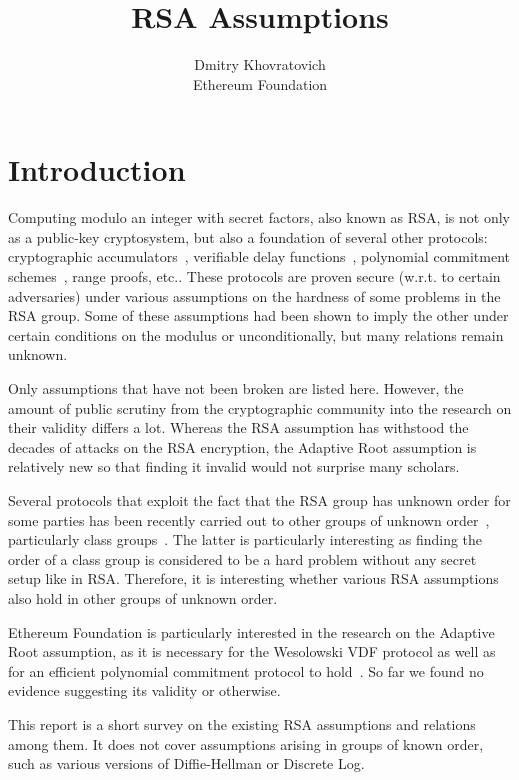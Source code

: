 \documentclass[a4paper]{article}
\title{RSA Assumptions}
\author{Dmitry Khovratovich\\Ethereum Foundation}
\begin{document}
\maketitle

\section{Introduction}

Computing modulo an integer with secret factors, also known as RSA, is not only as a public-key cryptosystem, but also  a foundation of several other protocols: cryptographic accumulators~\cite{DBLP:conf/crypto/CamenischL02}, verifiable delay functions~\cite{DBLP:conf/eurocrypt/Wesolowski19,DBLP:conf/crypto/BonehBBF18}, polynomial commitment schemes~\cite{cryptoeprint:2019:1229}, range proofs, etc.. These protocols are proven secure (w.r.t. to certain adversaries) under various assumptions on the hardness of some problems in the RSA group.  Some of these assumptions had been shown to imply the other under certain conditions on the modulus or unconditionally, but many relations remain unknown. 

Only assumptions that have not been broken are listed here. However, the amount of public scrutiny from the cryptographic community into the research on their validity differs a lot. Whereas the RSA assumption has withstood the decades of attacks on the RSA encryption, the Adaptive Root assumption is relatively new so that finding it invalid would not surprise many scholars.

Several protocols that exploit the fact that the RSA group has unknown order for some parties has been recently carried out to other groups of unknown order~\cite{DBLP:conf/crypto/BonehBBF18,cryptoeprint:2019:1229}, particularly class groups~\cite{buchmann2001survey}. The latter is particularly interesting as finding the order of a class group is considered to be a hard problem without any secret setup like in RSA. Therefore, it is interesting whether various RSA assumptions also hold in other groups of unknown order.

Ethereum Foundation is particularly interested in the research on the Adaptive Root assumption, as it is necessary for the Wesolowski VDF protocol as well as for an efficient polynomial commitment protocol to hold~\cite{DBLP:conf/eurocrypt/Wesolowski19}. So far we found no evidence suggesting its validity or otherwise.

This report is a short survey on the existing RSA assumptions and relations among them. It does not cover assumptions arising in  groups of known order, such as various versions of Diffie-Hellman or Discrete Log. 
\end{document}

